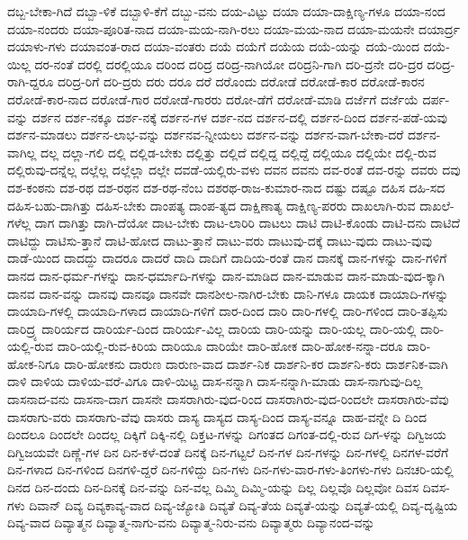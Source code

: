 {ದಬ್ಬ-ಬೇಕಾ-ಗಿದೆ
ದಬ್ಬಾ-ಳಿಕೆ
ದಬ್ಬಾಳಿ-ಕೆಗೆ
ದಬ್ಬು-ವನು
ದಯ-ವಿಟ್ಟು
ದಯಾ
ದಯಾ-ದಾಕ್ಷಿಣ್ಯ-ಗಳೂ
ದಯಾ-ನಂದ
ದಯಾ-ನಂದರು
ದಯಾ-ಪೂರಿತ-ನಾದ
ದಯಾ-ಮಯ-ನಾಗಿ-ರಲು
ದಯಾ-ಮಯ-ನಾದ
ದಯಾ-ಮಯನೇ
ದಯಾರ್ದ್ರ
ದಯಾಳು-ಗಳು
ದಯಾವಂತ-ರಾದ
ದಯಾ-ವಂತರು
ದಯೆ
ದಯೆಗೆ
ದಯೆಯ
ದಯೆ-ಯನ್ನು
ದಯೆ-ಯಿಂದ
ದಯೆ-ಯಿಲ್ಲ
ದರ-ನಂತೆ
ದರಲ್ಲಿ
ದರಲ್ಲಿಯೂ
ದರಿಂದ
ದರಿದ್ರ
ದರಿದ್ರ-ನಾಗಿಯೋ
ದರಿದ್ರನಿ-ಗಾಗಿ
ದರಿ-ದ್ರನೇ
ದರಿ-ದ್ರರ
ದರಿದ್ರ-ರಾಗಿ-ದ್ದರೂ
ದರಿದ್ರ-ರಿಗೆ
ದರಿ-ದ್ರರು
ದರು
ದರೂ
ದರೆ
ದರೊಂದು
ದರೋಡೆ
ದರೋಡೆ-ಕಾರ
ದರೋಡೆ-ಕಾರನ
ದರೋಡೆ-ಕಾರ-ನಾದ
ದರೋಡೆ-ಗಾರ
ದರೋಡೆ-ಗಾರರು
ದರೋ-ಡೆಗೆ
ದರೋಡೆ-ಮಾಡಿ
ದರ್ಜೆಗೆ
ದರ್ಜೆಯೆ
ದರ್ಪ-ವನ್ನು
ದರ್ಶನ
ದರ್ಶ-ನಕ್ಕೂ
ದರ್ಶ-ನಕ್ಕೆ
ದರ್ಶನ-ಗಳ
ದರ್ಶ-ನದ
ದರ್ಶನ-ದಲ್ಲಿ
ದರ್ಶನ-ದಿಂದ
ದರ್ಶನ-ಪಡೆ-ಯವು
ದರ್ಶನ-ಮಾಡಲು
ದರ್ಶನ-ಲಾಭ-ವನ್ನು
ದರ್ಶನವ-ನ್ನೀಯಲು
ದರ್ಶನ-ವನ್ನು
ದರ್ಶನ-ವಾಗ-ಬೇಕಾ-ದರೆ
ದರ್ಶನ-ವಾಗಿಲ್ಲ
ದಲ್ಲ
ದಲ್ಲಾ-ಗಲಿ
ದಲ್ಲಿ
ದಲ್ಲಿಡ-ಬೇಕು
ದಲ್ಲಿತ್ತು
ದಲ್ಲಿದೆ
ದಲ್ಲಿದ್ದ
ದಲ್ಲಿದ್ದೆ
ದಲ್ಲಿಯೂ
ದಲ್ಲಿಯೇ
ದಲ್ಲಿ-ರುವ
ದಲ್ಲಿರುವು-ದನ್ನೆಲ್ಲ
ದಲ್ಲೆಲ್ಲ
ದಲ್ಲೆಲ್ಲಾ
ದಲ್ಲೇ
ದವಡೆ-ಯಲ್ಲಿರು-ವಳು
ದವನ
ದವನು
ದವ-ರಂತೆ
ದವ-ರನ್ನು
ದವರು
ದವು
ದಶ-ಕಂಠನು
ದಶ-ರಥ
ದಶ-ರಥನ
ದಶ-ರಥ-ನೆಂಬ
ದಶರಥ-ರಾಜ-ಕುಮಾರ-ನಾದ
ದಷ್ಟು
ದಷ್ಟೂ
ದಹಿಸ
ದಹಿ-ಸದ
ದಹಿಸ-ಬಹು-ದಾಗಿತ್ತು
ದಹಿಸ-ಬೇಕು
ದಾಂಪತ್ಯ
ದಾಂಪ-ತ್ಯದ
ದಾಕ್ಷಿಣಾತ್ಯ
ದಾಕ್ಷಿಣ್ಯ-ಪರರು
ದಾಖಲಾಗಿ-ರುವ
ದಾಖಲೆ-ಗಳೆಲ್ಲ
ದಾಗ
ದಾಗಿತ್ತು
ದಾಗಿ-ದೆಯೋ
ದಾಟ-ಬೇಕು
ದಾಟ-ಲಾರಿರಿ
ದಾಟಲು
ದಾಟಿ
ದಾಟಿ-ಕೊಂಡು
ದಾಟಿ-ದನು
ದಾಟಿದೆ
ದಾಟಿದ್ದು
ದಾಟಿಸು-ತ್ತಾನೆ
ದಾಟಿ-ಹೋದ
ದಾಟು-ತ್ತಾನೆ
ದಾಟು-ವರು
ದಾಟುವು-ದಕ್ಕೆ
ದಾಟು-ವುದು
ದಾಟು-ವುವು
ದಾಡೆ-ಯಿಂದ
ದಾದದ್ದು
ದಾದರೂ
ದಾದರೆ
ದಾದಿ
ದಾದಿಗೆ
ದಾದಿಯ-ರಂತೆ
ದಾನ
ದಾನಕ್ಕೆ
ದಾನ-ಗಳನ್ನು
ದಾನ-ಗಳಿಗೆ
ದಾನದ
ದಾನ-ಧರ್ಮ-ಗಳನ್ನು
ದಾನ-ಧರ್ಮಾದಿ-ಗಳನ್ನು
ದಾನ-ಮಾಡಿದ
ದಾನ-ಮಾಡುವ
ದಾನ-ಮಾಡು-ವುದ-ಕ್ಕಾಗಿ
ದಾನವ
ದಾನ-ವನ್ನು
ದಾನವು
ದಾನವೂ
ದಾನವೇ
ದಾನಶೀಲ-ನಾಗಿರ-ಬೇಕು
ದಾನಿ-ಗಳೂ
ದಾಯಕ
ದಾಯಾದಿ-ಗಳನ್ನು
ದಾಯಾದಿ-ಗಳಲ್ಲಿ
ದಾಯಾದಿ-ಗಳಾದ
ದಾಯಾದಿ-ಗಳಿಗೆ
ದಾರ-ದಿಂದ
ದಾರಿ
ದಾರಿ-ಗಳಲ್ಲಿ
ದಾರಿ-ಗಳಿಂದ
ದಾರಿ-ತಪ್ಪಿಸು
ದಾರಿದ್ರ್ಯ
ದಾರಿರ್ಯದ
ದಾರಿರ್ಯ-ದಿಂದ
ದಾರಿರ್ಯ-ವಿಲ್ಲ
ದಾರಿಯ
ದಾರಿ-ಯನ್ನು
ದಾರಿ-ಯಲ್ಲ
ದಾರಿ-ಯಲ್ಲಿ
ದಾರಿ-ಯಲ್ಲಿ-ರುವ
ದಾರಿ-ಯಲ್ಲಿ-ರುವ-ಕಿರಿಯ
ದಾರಿಯೂ
ದಾರಿಯೇ
ದಾರಿ-ಹೋಕ
ದಾರಿ-ಹೋಕ-ನನ್ನಾ-ದರೂ
ದಾರಿ-ಹೋಕ-ನಿಗೂ
ದಾರಿ-ಹೋಕನು
ದಾರುಣ
ದಾರುಣ-ವಾದ
ದಾರ್ಶ-ನಿಕ
ದಾರ್ಶನಿ-ಕರ
ದಾರ್ಶನಿ-ಕರು
ದಾರ್ಶನಿಕ-ವಾಗಿ
ದಾಳಿ
ದಾಳಿಯ
ದಾಳಿಯ-ವರೆ-ವಿಗೂ
ದಾಳಿ-ಯಿಟ್ಟ
ದಾಸ-ನನ್ನಾಗಿ
ದಾಸ-ನನ್ನಾಗಿ-ಮಾಡು
ದಾಸ-ನಾಗುವು-ದಿಲ್ಲ
ದಾಸನಾದ-ವನು
ದಾಸನಾ-ದಾಗ
ದಾಸನೇ
ದಾಸರಾಗಿರು-ವುದ-ರಿಂದ
ದಾಸರಾಗಿರು-ವುದ-ರಿಂದಲೇ
ದಾಸರಾಗಿರು-ವೆವು
ದಾಸರಾಗು-ವರು
ದಾಸರಾಗು-ವೆವು
ದಾಸರು
ದಾಸ್ಯ
ದಾಸ್ಯದ
ದಾಸ್ಯ-ದಿಂದ
ದಾಸ್ಯ-ವನ್ನೂ
ದಾಹ-ವನ್ನೇ
ದಿ
ದಿಂದ
ದಿಂದಲೂ
ದಿಂದಲೇ
ದಿಂದಲ್ಲ
ದಿಕ್ಕಿಗೆ
ದಿಕ್ಕಿ-ನಲ್ಲಿ
ದಿಕ್ತಟ-ಗಳನ್ನು
ದಿಗಂತದ
ದಿಗಂತ-ದಲ್ಲಿ-ರುವ
ದಿಗ-ಳನ್ನು
ದಿಗ್ವಿಜಯ
ದಿಗ್ವಿಜಯವೇ
ದಿಣ್ಣೆ-ಗಳ
ದಿನ
ದಿನ-ಕಳೆ-ದಂತೆ
ದಿನಕ್ಕೆ
ದಿನ-ಗಟ್ಟಲೆ
ದಿನ-ಗಳ
ದಿನ-ಗಳನ್ನು
ದಿನ-ಗಳಲ್ಲಿ
ದಿನಗಳ-ವರೆಗೆ
ದಿನ-ಗಳಾದ
ದಿನ-ಗಳಿಂದ
ದಿನಗಳಿ-ದ್ದರೆ
ದಿನ-ಗಳಿದ್ದು
ದಿನ-ಗಳು
ದಿನ-ಗಳು-ವಾರ-ಗಳು-ತಿಂಗಳು-ಗಳು
ದಿನಚರಿ-ಯಲ್ಲಿ
ದಿನದ
ದಿನ-ದಂದು
ದಿನ-ದಿನಕ್ಕೆ
ದಿನ-ವನ್ನು
ದಿನ-ವಲ್ಲ
ದಿಮ್ಮಿ
ದಿಮ್ಮಿ-ಯನ್ನು
ದಿಲ್ಲ
ದಿಲ್ಲವೊ
ದಿಲ್ಲವೋ
ದಿವಸ
ದಿವಸ-ಗಳು
ದಿವಾನ್
ದಿವ್ಯ
ದಿವ್ಯಕಾವ್ಯ-ವಾದ
ದಿವ್ಯ-ಜ್ಯೋತಿ
ದಿವ್ಯತೆ
ದಿವ್ಯ-ತೆಯ
ದಿವ್ಯತೆ-ಯನ್ನು
ದಿವ್ಯತೆ-ಯಲ್ಲಿ
ದಿವ್ಯ-ದೃಷ್ಟಿಯ
ದಿವ್ಯ-ವಾದ
ದಿವ್ಯಾತ್ಮನ
ದಿವ್ಯಾತ್ಮ-ನಾಗು-ವನು
ದಿವ್ಯಾತ್ಮ-ನಿರು-ವನು
ದಿವ್ಯಾತ್ಮರು
ದಿವ್ಯಾನಂದ-ವನ್ನು
}
